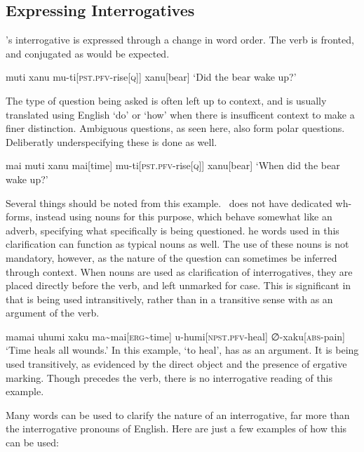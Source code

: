 \subsection{Expressing Interrogatives}

\langname 's interrogative is expressed through a change in word order. The verb is fronted, and conjugated as would be expected.

\ex
\begingl
\glpreamble muti xanu
\endpreamble
mu-ti[\textsc{pst.pfv-}rise\textsc{[q]}]
xanu[bear]
\glft `Did the bear wake up?'
\endgl
\xe

The type of question being asked is often left up to context, and is usually translated using English `do' or `how' when there is insufficent context to make a finer distinction. Ambiguous questions, as seen here, also form polar questions. Deliberatly underspecifying these is done as well.

\ex
\begingl
\glpreamble mai muti xanu
\endpreamble
mai[time]
mu-ti[\textsc{pst.pfv-}rise\textsc{[q]}]
xanu[bear]
\glft `When did the bear wake up?'
\endgl
\xe

Several things should be noted from this example. \langname\ does not have dedicated wh-forms, instead using nouns for this purpose, which behave somewhat like an adverb, specifying what specifically is being questioned. he words used in this clarification can function as typical nouns as well. The use of these nouns is not mandatory, however, as the nature of the question can sometimes be inferred through context. When nouns are used as clarification of interrogatives, they are placed directly before the verb, and left unmarked for case. This is significant in that  is being used intransitively, rather than in a transitive sense with  as an argument of the verb.

\ex
\begingl
\glpreamble mamai uhumi xaku
\endpreamble
ma\textasciitilde mai[\textsc{erg\textasciitilde}time]
u-humi[\textsc{npst.pfv-}heal]
∅-xaku[\textsc{abs-}pain]
\glft `Time heals all wounds.'
\endgl
\xe
In this example,  `to heal', has  as an argument. It is being used transitively, as evidenced by the direct object  and the presence of ergative marking. Though  precedes the verb, there is no interrogative reading of this example.

Many words can be used to clarify the nature of an interrogative, far more than the interrogative pronouns of English. Here are just a few examples of how this can be used:

